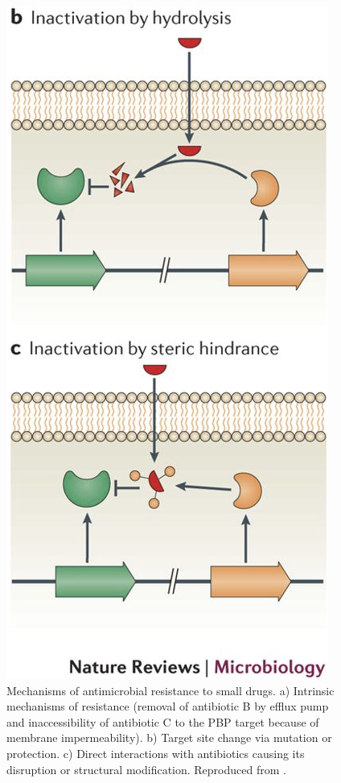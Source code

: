 \begin{figure}[h]
\begin{center}
\includegraphics[height = 0.36\textheight]{1introduction/pics/amr4_half}
\caption[Mechanisms of antimicrobial resistance to small drugs]{Mechanisms of antimicrobial resistance to small drugs. a) Intrinsic mechanisms of resistance (removal of antibiotic B by efflux pump and inaccessibility of antibiotic C to the PBP target because of membrane impermeability). b) Target site change via mutation or protection. c) Direct interactions with antibiotics causing its disruption or structural modification. Reproduced from \cite{Blair2014}.} \label{fig:amr}
\end{center}
\end{figure}


